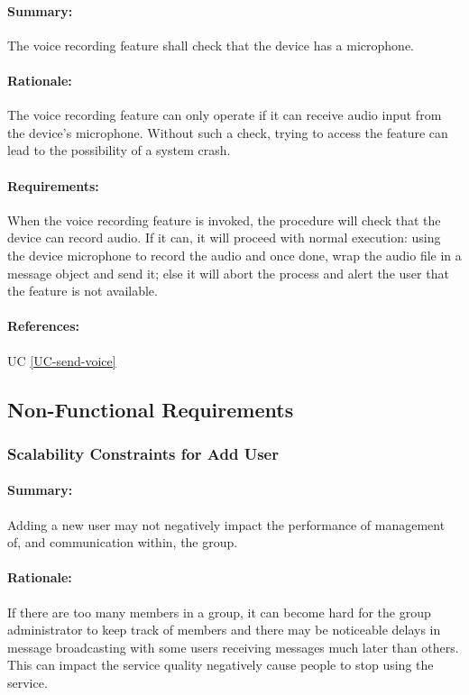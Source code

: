 \documentclass[11pt]{article}
\begin{document}
\paragraph{Summary:} The voice recording feature shall check that the device has a microphone.
\paragraph{Rationale:} The voice recording feature can only operate if it can receive audio input from the device's microphone. Without such a check, trying to access the feature can lead to the possibility of a system crash.
\paragraph{Requirements:} When the voice recording feature is invoked, the procedure will check that the device can record audio. If it can, it will proceed with normal execution: using the device microphone to record the audio and once done, wrap the audio file in a message object and send it; else it will abort the process and alert the user that the feature is not available.
\paragraph{References:} UC \ref{UC-send-voice}

\subsection{Non-Functional Requirements}

\subsubsection{Scalability Constraints for Add User} \label{NFR-scalability-add-member}
\paragraph{Summary:} Adding a new user may not negatively impact the performance of management of, and communication within, the group.
\paragraph{Rationale:} If there are too many members in a group, it can become hard for the group administrator to keep track of members and there may be noticeable delays in message broadcasting with some users receiving messages much later than others. This can impact the service quality negatively cause people to stop using the service.
\end{document}
